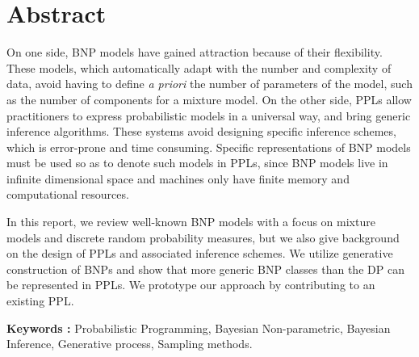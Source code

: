 \documentclass[twoside,10pt,openany,a4paper]{rapport}
\begin{document}
\chapter{Abstract}

On one side, \gls{BNP} models have gained attraction because of their flexibility. These models, which automatically adapt with the number and complexity of data, avoid having to define \textit{a priori} the number of parameters of the model, such as the number of components for a mixture model.
On the other side, \glspl{PPL} allow practitioners to express probabilistic models in a universal way, and bring generic inference algorithms. These systems avoid designing specific inference schemes, which is error-prone and time consuming.
Specific representations of \gls{BNP} models must be used so as to denote such models in \glspl{PPL}, since \gls{BNP} models live in infinite dimensional space and machines only have finite memory and computational resources.

In this report, we review well-known \gls{BNP} models with a focus on mixture models and discrete random probability measures, but we also give background on the design of \glspl{PPL} and associated inference schemes. We utilize generative construction of \glspl{BNP} and show that more generic \gls{BNP} classes than the \acrlong{DP} can be represented in \glspl{PPL}. We prototype our approach by contributing to an existing \gls{PPL}.

\textbf{Keywords :} Probabilistic Programming, Bayesian Non-parametric, Bayesian Inference, Generative process, Sampling methods.



\tableofcontents
{}


\end{document}
